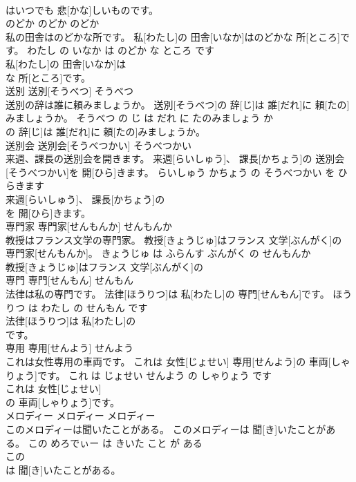 \documentclass[8pt]{extreport}
\begin{document}
\begin{CJK}{UTF8}{min}
\\	はいつでも 悲[かな]しいものです。			
\\	のどか	のどか	のどか	
\\	私の田舎はのどかな所です。	私[わたし]の 田舎[いなか]はのどかな 所[ところ]です。	わたし の いなか は のどか な ところ です	
\\	私[わたし]の 田舎[いなか]は
\\	な 所[ところ]です。			
\\	送別	送別[そうべつ]	そうべつ	
\\	送別の辞は誰に頼みましょうか。	送別[そうべつ]の 辞[じ]は 誰[だれ]に 頼[たの]みましょうか。	そうべつ の じ は だれ に たのみましょう か	
\\	の 辞[じ]は 誰[だれ]に 頼[たの]みましょうか。			
\\	送別会	送別会[そうべつかい]	そうべつかい	
\\	来週、課長の送別会を開きます。	来週[らいしゅう]、 課長[かちょう]の 送別会[そうべつかい]を 開[ひら]きます。	らいしゅう かちょう の そうべつかい を ひらきます	
\\	来週[らいしゅう]、 課長[かちょう]の
\\	を 開[ひら]きます。			
\\	専門家	専門家[せんもんか]	せんもんか	
\\	教授はフランス文学の専門家。	教授[きょうじゅ]はフランス 文学[ぶんがく]の 専門家[せんもんか]。	きょうじゅ は ふらんす ぶんがく の せんもんか	
\\	教授[きょうじゅ]はフランス 文学[ぶんがく]の
\\	専門	専門[せんもん]	せんもん	
\\	法律は私の専門です。	法律[ほうりつ]は 私[わたし]の 専門[せんもん]です。	ほうりつ は わたし の せんもん です	
\\	法律[ほうりつ]は 私[わたし]の
\\	です。			
\\	専用	専用[せんよう]	せんよう	
\\	これは女性専用の車両です。	これは 女性[じょせい] 専用[せんよう]の 車両[しゃりょう]です。	これ は じょせい せんよう の しゃりょう です	
\\	これは 女性[じょせい]
\\	の 車両[しゃりょう]です。			
\\	メロディー	メロディー	メロディー	
\\	このメロディーは聞いたことがある。	このメロディーは 聞[き]いたことがある。	この めろでぃー は きいた こと が ある	
\\	この
\\	は 聞[き]いたことがある。			

\end{CJK}
\end{document}
